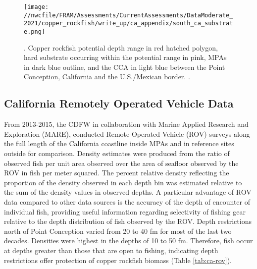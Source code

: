 \documentclass[11pt,
  english,
  a4paper,
]{article}
\begin{document}
\tagmcend\tagstructend


\begin{figure}
\centering
\texttt{[image: //nwcfile/FRAM/Assessments/CurrentAssessments/DataModerate\_2021/copper\_rockfish/write\_up/ca\_appendix/south\_ca\_substrate.png]}
\caption{. Copper rockfish potential depth range in red hatched polygon, hard substrate occurring within the potential range in pink, MPAs in dark blue outline, and the CCA in light blue between the Point Conception, California and the U.S./Mexican border. .\label{fig:south-ca-app}}
\end{figure}

\tagmcend\tagstructend

\newpage


\hypertarget{california-remotely-operated-vehicle-data}{%
\subsection{California Remotely Operated Vehicle Data}\label{california-remotely-operated-vehicle-data}}

\leavevmode\tagmcend\tagstructend


From 2013-2015, the CDFW in collaboration with Marine Applied Research and Exploration (MARE), conducted Remote Operated Vehicle (ROV) surveys along the full length of the California coastline inside MPAs and in reference sites outside for comparison. Density estimates were produced from the ratio of observed fish per unit area observed over the area of seafloor observed by the ROV in fish per meter squared. The percent relative density reflecting the proportion of the density observed in each depth bin was estimated relative to the sum of the density values in observed depths. A particular advantage of ROV data compared to other data sources is the accuracy of the depth of encounter of individual fish, providing useful information regarding selectivity of fishing gear relative to the depth distribution of fish observed by the ROV. Depth restrictions north of Point Conception varied from 20 to 40 fm for most of the last two decades. Densities were highest in the depths of 10 to 50 fm. Therefore, fish occur at depths greater than those that are open to fishing, indicating depth restrictions offer protection of copper rockfish biomass (Table \ref{tab:ca-rov}).
\end{document}
